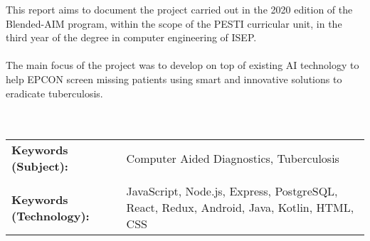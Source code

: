 This report aims to document the project carried out in the 2020 edition of the Blended-AIM program, within the scope of the PESTI curricular unit, in the third year of the degree in computer engineering of ISEP.
\\ \\
The main focus of the project was to develop on top of existing AI technology to help EPCON screen missing patients using smart and innovative solutions to eradicate tuberculosis.
\\ \\ \\

\begin{tabular}{>{\raggedright\arraybackslash}p{6.3cm}p{8cm}}
	\textbf{Keywords (Subject):}	
	& Computer Aided Diagnostics, Tuberculosis
	\\ \\
	\textbf{Keywords (Technology):}
	& 	JavaScript, Node.js, Express, PostgreSQL, React, Redux, Android, Java, Kotlin, HTML, CSS \\ 
\end{tabular} 






